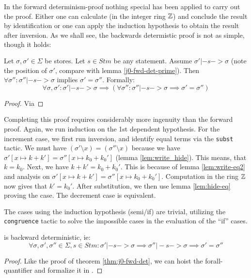 In the forward determinism-proof nothing special has been applied to
carry out the proof. Either one can calculate (in the integer ring
$\mathbb{Z}$) and conclude the result by identification or one can apply the
induction hypothesis to obtain the result after inversion. As we shall
see, the backwards determistic proof is not as simple, though it
holds:

\begin{lem}
  Let $\sigma, \sigma' \in \Sigma$ be stores. Let $s \in Stm$ be any
  statement. Assume $\sigma' |- s -> \sigma$ (note the position of
  $\sigma'$, compare with lemma \eqref{j0-fwd-det-prime}). Then
  $\forall \sigma'' \colon \sigma'' |- s -> \sigma$ implies $\sigma' =
  \sigma''$. Formally:
  \begin{equation*}
    \forall \sigma, \sigma' \colon \sigma' |- s -> \sigma \implies
    (\forall \sigma'' \colon \sigma'' |- s -> \sigma \implies \sigma'
    = \sigma'')
  \end{equation*}
\end{lem}
\begin{proof}
  Via \coq{}
\end{proof}

Completing this proof requires considerably more ingenuity than the
forward proof. Again, we run induction on the 1st dependent
hypothesis. For the increment case, we first run inversion, and
identify equal terms via the \texttt{subst} tactic. We must have
$(\sigma' \setminus x) = (\sigma'' \setminus x)$ because we have
$\sigma'[x \mapsto k + k'] = \sigma''[x \mapsto k_0 + k_0']$ (lemma
\eqref{lem:write_hide}). This means, that $k = k_0$. Next, we have $k
+ k' = k_0 + k_0'$. This is because of lemma \eqref{lem:write-eq2} and
analysis on $\sigma'[x \mapsto k + k'] = \sigma''[x \mapsto k_0 +
k_0']$. Computation in the ring $\mathbb{Z}$ now gives that $k' =
k_0'$. After substitution, we then use lemma \eqref{lem:hide-eq}
proving the case. The decrement case is equivalent.

The cases using the induction hypothesis (semi/if) are trivial,
utilizing the \texttt{congruence} tactic to solve the impossible cases
in the evaluation of the ``if'' cases.

\begin{thm}
  \janusz{} is backward deterministic, ie:
  \begin{equation*}
    \forall \sigma, \sigma', \sigma'' \in \Sigma, s \in Stm \colon \sigma' |- s
    -> \sigma \implies \sigma'' |- s -> \sigma \implies \sigma' = \sigma''
  \end{equation*}
\end{thm}
\begin{proof}
  Like the proof of theorem \eqref{thm:j0-fwd-det}, we can hoist the
  forall-quantifier and formalize it in \coq{}.
\end{proof}

